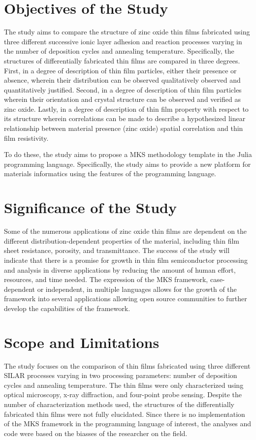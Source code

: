 \section{Objectives of the Study}
The study aims to compare the structure of zinc oxide thin films fabricated using three different successive ionic layer adhesion and reaction processes varying in the number of deposition cycles and annealing temperature.
Specifically, the structures of differentially fabricated thin films are compared in three degrees.
First, in a degree of description of thin film particles, either their presence or absence, wherein their distribution can be observed qualitatively observed and quantitatively justified.
Second, in a degree of description of thin film particles wherein their orientation and crystal structure can be observed and verified as zinc oxide.
Lastly, in a degree of description of thin film property with respect to its structure wherein correlations can be made to describe a hypothesized linear relationship between material presence (zinc oxide) spatial correlation and thin film resistivity.

To do these, the study aims to propose a MKS methodology template in the Julia programming language.
Specifically, the study aims to provide a new platform for materials informatics using the features of the programming language.

\section{Significance of the Study}
Some of the numerous applications of zinc oxide thin films are dependent on the different distribution-dependent properties of the material, including thin film sheet resistance, porosity, and transmittance.
The success of the study will indicate that there is a promise for growth in thin film semiconductor processing and analysis in diverse applications by reducing the amount of human effort, resources, and time needed.
The expression of the MKS framework, case-dependent or independent, in multiple languages allows for the growth of the framework into several applications allowing open source communities to further develop the capabilities of the framework.

\section{Scope and Limitations}
The study focuses on the comparison of thin films fabricated using three different SILAR processes varying in two processing parameters: number of deposition cycles and annealing temperature.
The thin films were only characterized using optical microscopy, x-ray diffraction, and four-point probe sensing.
Despite the number of characterization methods used, the structures of the differentially fabricated thin films were not fully elucidated.
Since there is no implementation of the MKS framework in the programming language of interest, the analyses and code were based on the biasses of the researcher on the field.
